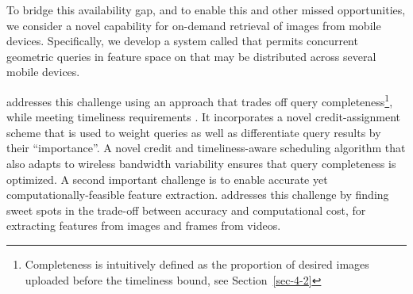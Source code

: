 To bridge this availability gap, and to enable this and other missed
opportunities,
 we consider a novel
capability for
 on-demand retrieval of images from mobile devices.
%
Specifically, we develop a system called \mscope that permits
concurrent
geometric queries in feature space on
that may be distributed across several mobile devices.
%
%



\mscope addresses this challenge using an approach that trades off
query completeness\footnote{Completeness is intuitively defined as the proportion of desired images uploaded before the timeliness bound, see Section~\ref{sec-4-2}}, while meeting
timeliness requirements
.
%
It incorporates a novel credit-assignment scheme that is used to
weight queries as well as differentiate query results
by their ``importance''.
%
A novel credit and timeliness-aware scheduling algorithm that also
adapts to wireless bandwidth variability ensures that query completeness
is optimized.
%
A second important challenge is to enable accurate yet
computationally-feasible feature extraction.
%
\mscope addresses this challenge by finding sweet spots in the
trade-off between accuracy and computational cost, for extracting
features from images and frames from videos.


